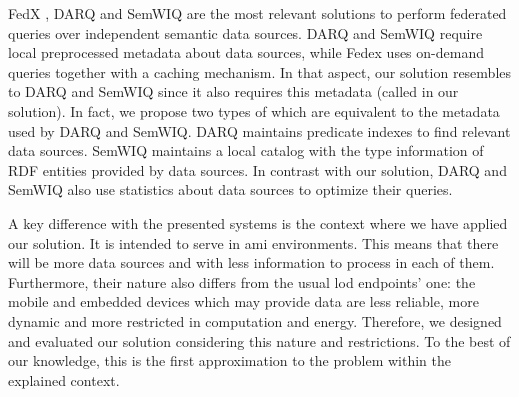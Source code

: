 \bigskip


FedX \citep{schwarte_fedx_federation2011,schwarte_fedx_optimization_2011}, DARQ \citep{quilitz_querying_2008} and SemWIQ \citep{langegger_semantic_2008} are the most relevant solutions to perform federated queries over independent semantic data sources.
DARQ and SemWIQ require local preprocessed metadata about data sources, while Fedex uses on-demand queries together with a caching mechanism. %
In that aspect, our solution resembles to DARQ and SemWIQ since it also requires this metadata (called \clues{} in our solution).
In fact, we propose two types of \clues{} which are equivalent to the metadata used by DARQ and SemWIQ.
DARQ maintains predicate indexes to find relevant data sources.
SemWIQ maintains a local catalog with the type information of RDF entities provided by data sources. %
In contrast with our solution, DARQ and SemWIQ also use statistics about data sources to optimize their queries.


A key difference with the presented systems is the context where we have applied our solution.
It is intended to serve in \ac{ami} environments.
This means that there will be more data sources and with less information to process in each of them.
Furthermore, their nature also differs from the usual \ac{lod} endpoints' one: the mobile and embedded devices which may provide data are less reliable, more dynamic and more restricted in computation and energy.
Therefore, we designed and evaluated our solution considering this nature and restrictions.
To the best of our knowledge, this is the first approximation to the problem within the explained context.


